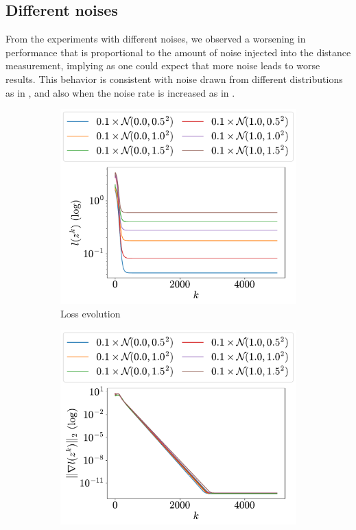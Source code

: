 \documentclass[a4paper,11pt,oneside]{book}
\begin{document}
\subsection{Different noises}

From the experiments with different noises, we observed a worsening in performance that is proportional to the amount of noise injected into the distance measurement, implying as one could expect that more noise leads to worse results. This behavior is consistent with noise drawn from different distributions as in , and also when the noise rate is increased as in .

\begin{figure}[H]
      \centering
      \begin{subfigure}[t]{0.48\linewidth}
            \centering
            \includegraphics[width=\linewidth]{./figs/tracking/gaussian/loss.pdf} 
            \caption{Loss evolution}
      \end{subfigure}
      \hfill
      \begin{subfigure}[t]{0.48\linewidth}
            \centering
            \includegraphics[width=\linewidth]{./figs/tracking/gaussian/gradient.pdf} 

\end{subfigure}
\end{figure}
\end{document}

